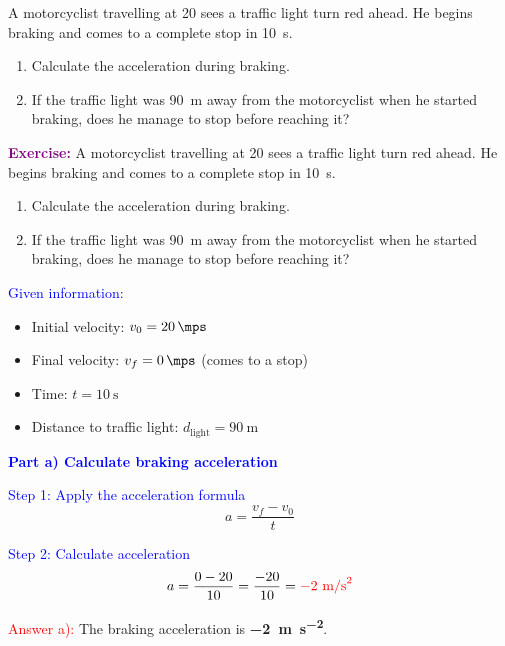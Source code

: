 \begin{exercise}
    A motorcyclist travelling at \qty{20}{\mps} sees a traffic light turn red ahead. He begins braking and comes to a complete stop in \qty{10}{\s}.
    \begin{enumerate}[label=\letraminuscula]
    \item Calculate the acceleration during braking.
    \item If the traffic light was \qty{90}{\m} away from the motorcyclist when he started braking, does he manage to stop before reaching it?
    \end{enumerate}
    \begin{solu}
        \textbf{\textcolor{purple}{Exercise:}} A motorcyclist travelling at \qty{20}{\mps} sees a traffic light turn red ahead. He begins braking and comes to a complete stop in \qty{10}{\s}.
        \begin{enumerate}[label=\letraminuscula]
            \item Calculate the acceleration during braking.
            \item If the traffic light was \qty{90}{\m} away from the motorcyclist when he started braking, does he manage to stop before reaching it?
        \end{enumerate}

        \vspace{0.3cm}

        \textcolor{blue}{Given information:}
        \begin{itemize}
            \item Initial velocity: $v_0 = \qty{20}{\mps}$
            \item Final velocity: $v_f = \qty{0}{\mps}$ (comes to a stop)
            \item Time: $t = \qty{10}{\s}$
            \item Distance to traffic light: $d_{\text{light}} = \qty{90}{\m}$
        \end{itemize}

        \textbf{\textcolor{blue}{Part a) Calculate braking acceleration}}

        \textcolor{blue}{Step 1: Apply the acceleration formula}
        \[
            \boxed{a = \frac{v_f - v_0}{t}}
        \]

        \textcolor{blue}{Step 2: Calculate acceleration}
        \[
            a = \frac{0 - 20}{10} = \frac{-20}{10} = \textcolor{red}{-2 \text{ m/s}^2}
        \]

        \textcolor{red}{Answer a):} The braking acceleration is \textbf{\qty{-2}{\metre\per\second\squared}}.


\end{solu}
\end{exercise}
